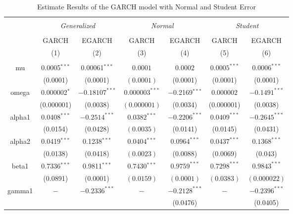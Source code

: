 \documentclass[a4paper]{article}
\begin{document}

\begin{table}[H] \centering 
  \caption{Estimate Results of the GARCH model with Normal and Student Error} 
  \label{tab:student} 
\begin{tabular}{@{\extracolsep{5pt}} ccccccc} 

\\[-1.8ex]\hline 
\hline \\[-1.8ex] 

& \multicolumn{2}{c}{\textit{Generalized}} & \multicolumn{2}{c}{\textit{Normal}} & \multicolumn{2}{c}{\textit{Student}}\\ 
\cline{2-7} 
\\[-1.8ex] & GARCH & EGARCH & GARCH & EGARCH & GARCH & EGARCH 
\\ 
& (1) & (2) & (3) & (4) & (5) & (6) \\ 
\hline \\[-1.8ex] 
mu & 0.0005$^{***}$ & 0.00061$^{***}$ & $0.0001$ & $0.0002$ & $0.0005^{***}$ & $0.0006^{***}$ \\
   & (0.0001) & (0.0001) & $(0.0001)$ & (0.0001) & (0.0001) & (0.0001)\\[1.8ex]

omega & 0.000002$^{*}$ & $-0.18107^{***}$ & $0.000003^{***}$ & $-$0.2169$^{***}$ & $0.000002$ & $-0.1491^{***}$  \\ 
& (0.000001) & (0.0038) &$(0.000001)$& (0.0034)& (0.000001) & (0.0038)\\[1.8ex]

alpha1 & 0.0408$^{***}$ & $-0.2514^{***}$ & $0.0382$$^{***}$ & $-0.2206^{***}$ & $0.0409^{***}$ & $-0.2645^{***}$  \\ 
& (0.0154) & (0.0428) &$(0.0035)$& (0.0141)& (0.0145) & (0.0431)\\[1.8ex]

alpha2 & 0.0419$^{***}$ & 0.1238$^{***}$ & $0.0404$$^{***}$ & $0.0964^{***}$ & $0.0437^{***}$ & $0.1368^{***}$ \\
& (0.0138) & (0.0418) &$(0.0023)$& (0.0088)& (0.0069)& (0.043)\\[1.8ex]

beta1 & 0.7336$^{***}$ & 0.9811$^{***}$ & $0.7430$$^{***}$ & $0.9759^{***}$ & $0.7298^{***}$ & $0.9843^{***}$  \\ 
& (0.0891) & (0.0001) & $(0.0159)$ & $(0.0001)$ & $(0.0383)$ & $(0.000022)$ \\[1.8ex] 

gamma1 & $-$ & $-0.2336^{***}$ & $-$ & $-0.2128^{***}$ & $-$ & $-0.2396^{***}$  \\ 
& & & & (0.0476)& &(0.0405)\\[1.8ex]


\end{tabular}
\end{table}
\end{document}
